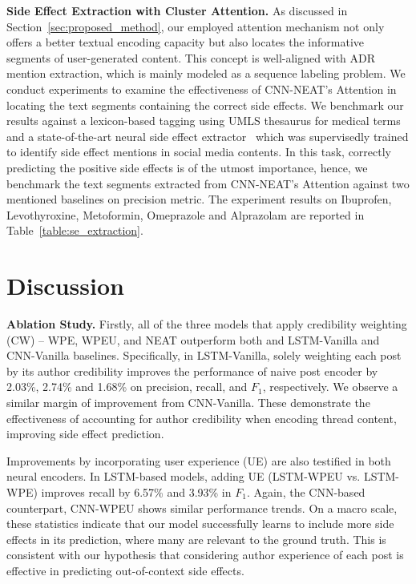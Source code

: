 \documentclass{bmcart}
\begin{document}
{\bf Side Effect Extraction with Cluster Attention.}\label{subsec:se_extraction}
As discussed in Section~\ref{sec:proposed_method}, our employed attention mechanism not only offers a better textual encoding capacity but also locates the informative segments of user-generated content. This concept is well-aligned with ADR mention extraction, which is mainly modeled as a sequence labeling problem. We conduct experiments to examine the effectiveness of CNN-NEAT's Attention in locating the text segments containing the correct side effects. We benchmark our results against a lexicon-based tagging using UMLS thesaurus for medical terms~\cite{bodenreider2004unified} and a state-of-the-art neural side effect extractor~\cite{ding2018attentive} which was supervisedly trained to identify side effect mentions in social media contents. In this task, correctly predicting the positive side effects is of the utmost importance, hence, we benchmark the text segments extracted from CNN-NEAT's Attention against two mentioned baselines on precision metric. The experiment results on Ibuprofen, Levothyroxine, Metoformin, Omeprazole and Alprazolam are reported in Table~\ref{table:se_extraction}.

\section{Discussion}\label{sec:discussion}
{\bf Ablation Study.}
Firstly, all of the three models that
apply credibility weighting (CW) -- WPE, WPEU, and NEAT
outperform both and LSTM-Vanilla and CNN-Vanilla baselines.
Specifically, in LSTM-Vanilla, solely weighting each post 
by its author credibility improves the performance of naive post encoder by 2.03\%, 2.74\% and 1.68\% on precision, recall, and $F_1$, respectively. We observe a similar margin of improvement from CNN-Vanilla. These demonstrate the effectiveness of accounting for author credibility when encoding thread content, improving side effect prediction.

Improvements by incorporating user experience (UE) are 
also testified in both neural encoders. In LSTM-based models, adding UE (LSTM-WPEU vs. LSTM-WPE) improves recall
by 6.57\% and 3.93\% in $F_1$.  Again, the CNN-based counterpart, CNN-WPEU shows similar performance trends.  On a macro scale, these statistics indicate 
that our model successfully learns to include more side effects in its prediction,
where many are relevant to the ground truth.  This is consistent with
our hypothesis that considering author experience of each post is effective in predicting out-of-context side effects.
\end{document}
